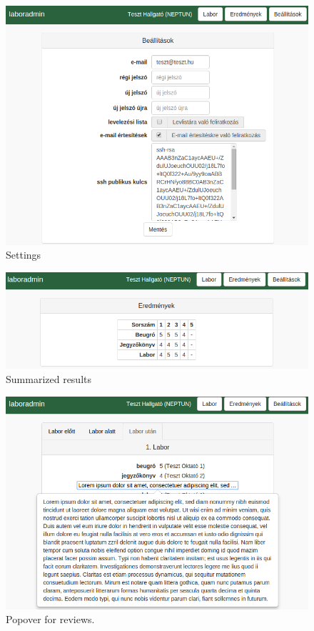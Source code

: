
\begin{figure}[!ht]
	\includegraphics[width=\textwidth]{figures/design/beallitasok.png}
	\caption{Settings}
	\label{fig:settings}
\end{figure}

\begin{figure}[!ht]
	\includegraphics[width=\textwidth]{figures/design/eredmenyek.png}
	\caption{Summarized results}
	\label{fig:results}
\end{figure}

\begin{figure}[!ht]
	\includegraphics[width=\textwidth]{figures/design/popup.png}
	\caption{Popover for reviews.}
	\label{fig:popup}
\end{figure}


